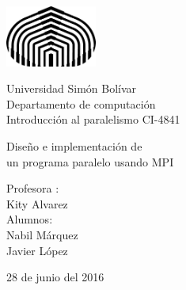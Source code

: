 

\begin{titlepage}

\setlength{\hoffset}{-0.2in}
\setlength{\voffset}{-1in}
\setlength{\topmargin}{1.5cm}
\setlength{\headheight}{0.5cm}
\setlength{\headsep}{1cm}
\setlength{\oddsidemargin}{3cm}
\setlength{\evensidemargin}{3cm}
\setlength{\footskip}{1.5cm}
\enlargethispage{1cm}

\fontsize{12pt}{14pt}
\selectfont

\begin{center}

\includegraphics[height=2cm]{logo.png}

\vspace{0.5cm}

Universidad Sim\'on Bol\'ivar\\
Departamento de computaci\'on\\
Introducción al paralelismo CI-4841\\

\vspace{3.5cm}

\fontsize{17.28pt}{21pt}
\selectfont

Diseño e implementación de \\
un programa paralelo usando MPI

\fontsize{12pt}{14pt}
\selectfont

\vspace{.6cm}



\vspace{.4cm}


\vspace{3.5cm}

Profesora : \\
Kity Alvarez\\
Alumnos: \\
Nabil M\'arquez\\
Javier  L\'opez

\vspace{2cm}


\vspace{1cm}

28 de junio del 2016

\end{center}
\end{titlepage}


